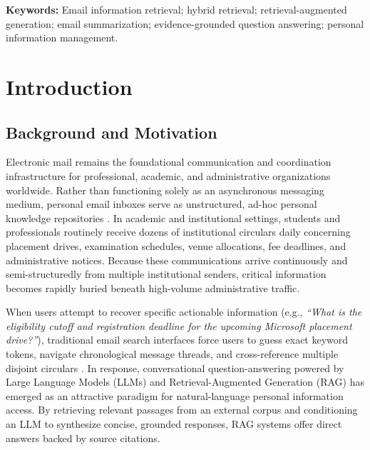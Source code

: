 \documentclass[11pt,a4paper]{article}
\begin{document}
\textbf{Keywords:} Email information retrieval; hybrid retrieval; retrieval-augmented generation; email summarization; evidence-grounded question answering; personal information management.

\newpage

\section{Introduction}

\subsection{Background and Motivation}
Electronic mail remains the foundational communication and coordination infrastructure for professional, academic, and administrative organizations worldwide. Rather than functioning solely as an asynchronous messaging medium, personal email inboxes serve as unstructured, ad-hoc personal knowledge repositories \cite{dumais2003stuff, bendersky2020search, ayalon2025mediation}. In academic and institutional settings, students and professionals routinely receive dozens of institutional circulars daily concerning placement drives, examination schedules, venue allocations, fee deadlines, and administrative notices. Because these communications arrive continuously and semi-structuredly from multiple institutional senders, critical information becomes rapidly buried beneath high-volume administrative traffic.

When users attempt to recover specific actionable information (e.g., \textit{``What is the eligibility cutoff and registration deadline for the upcoming Microsoft placement drive?''}), traditional email search interfaces force users to guess exact keyword tokens, navigate chronological message threads, and cross-reference multiple disjoint circulars \cite{kuzi2017query, bendersky2017learning}. In response, conversational question-answering powered by Large Language Models (LLMs) and Retrieval-Augmented Generation (RAG) \cite{lewis2020retrieval, gao2023rag_survey} has emerged as an attractive paradigm for natural-language personal information access. By retrieving relevant passages from an external corpus and conditioning an LLM to synthesize concise, grounded responses, RAG systems offer direct answers backed by source citations.
\end{document}

